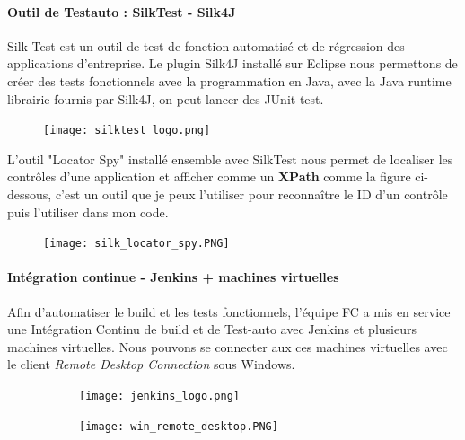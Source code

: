         \paragraph{Outil de Testauto : SilkTest - Silk4J}
        \par Silk Test est un outil de test de fonction automatisé et de régression des applications d'entreprise. Le plugin Silk4J installé sur Eclipse nous permettons de créer des tests fonctionnels avec la programmation en Java, avec la Java runtime librairie fournis par Silk4J, on peut lancer des JUnit test.
        \begin{figure}[H]
            \flushleft
            \texttt{[image: silktest\_logo.png]}
            \label{fig:silktest_logo}
        \end{figure}
        
        \par L'outil "Locator Spy" installé ensemble avec SilkTest nous permet de localiser les contrôles d'une application et afficher comme un \textbf{XPath} comme la figure ci-dessous, c'est un outil que je peux l'utiliser pour reconnaître le ID d'un contrôle puis l'utiliser dans mon code.
        \begin{figure}[H]
            \flushleft
            \texttt{[image: silk\_locator\_spy.PNG]}
            \label{fig:silk_locator_spy_label}
        \end{figure}
        
        \paragraph{Intégration continue - Jenkins + machines virtuelles}
        Afin d'automatiser le build et les tests fonctionnels, l'équipe FC a mis en service une Intégration Continu de build et de Test-auto avec Jenkins et plusieurs machines virtuelles. Nous pouvons se connecter aux ces machines virtuelles avec le client \textit{Remote Desktop Connection} sous Windows.
        \begin{figure}[H]
            \flushleft 
            \begin{subfigure}[b]{.35\textwidth}
                \texttt{[image: jenkins\_logo.png]}
            \end{subfigure}
            \begin{subfigure}[b]{.35\textwidth}
                \texttt{[image: win\_remote\_desktop.PNG]}
            \end{subfigure}
            \label{jenksin_+_win_remote_desktop_label}
        \end{figure}
       
